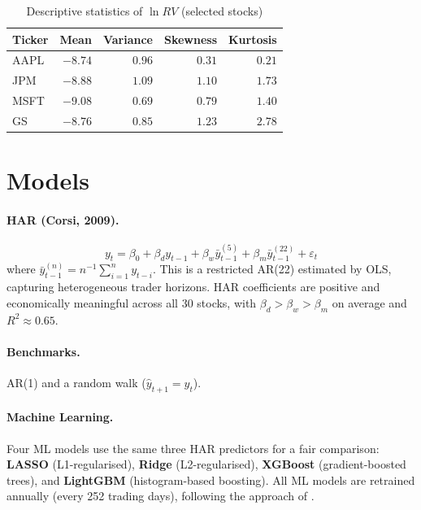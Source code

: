 \documentclass[10pt,twocolumn]{article}
\begin{document}
\begin{table}[H]
\centering\small
\caption{Descriptive statistics of $\ln RV$ (selected stocks)}
\label{tab:desc}
\begin{tabular}{lrrrr}
\toprule
Ticker & Mean & Variance & Skewness & Kurtosis \\
\midrule
AAPL & $-8.74$ & $0.96$ & $0.31$ & $0.21$ \\
JPM  & $-8.88$ & $1.09$ & $1.10$ & $1.73$ \\
MSFT & $-9.08$ & $0.69$ & $0.79$ & $1.40$ \\
GS   & $-8.76$ & $0.85$ & $1.23$ & $2.78$ \\
\bottomrule
\end{tabular}
\end{table}

\section{Models}

\paragraph{HAR (Corsi, 2009).}
\begin{equation}
  y_t = \beta_0 + \beta_d y_{t-1}
        + \beta_w \bar{y}^{(5)}_{t-1}
        + \beta_m \bar{y}^{(22)}_{t-1} + \varepsilon_t
  \label{eq:har}
\end{equation}
where $\bar{y}^{(n)}_{t-1}=n^{-1}\sum_{i=1}^{n}y_{t-i}$.
This is a restricted AR(22) estimated by OLS, capturing heterogeneous
trader horizons. HAR coefficients are positive and economically
meaningful across all 30 stocks, with $\beta_d > \beta_w > \beta_m$
on average and $R^2 \approx 0.65$.

\paragraph{Benchmarks.} AR(1) and a random walk ($\hat{y}_{t+1}=y_t$).

\paragraph{Machine Learning.}
Four ML models use the same three HAR predictors for a fair comparison:
\textbf{LASSO} (L1-regularised), \textbf{Ridge} (L2-regularised),
\textbf{XGBoost} (gradient-boosted trees), and
\textbf{LightGBM} (histogram-based boosting).
All ML models are retrained annually (every 252 trading days), following
the approach of \cite{kilic2025}.
\end{document}
